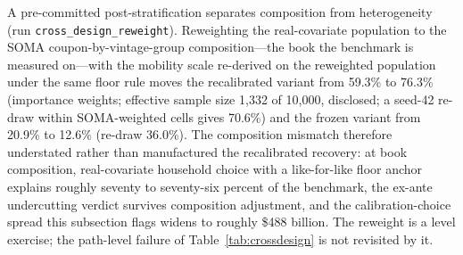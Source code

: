 \documentclass[12pt]{article}
\begin{document}
A pre-committed post-stratification separates composition from heterogeneity (run \texttt{cross\_design\_reweight}). Reweighting the real-covariate population to the SOMA coupon-by-vintage-group composition---the book the benchmark is measured on---with the mobility scale re-derived on the reweighted population under the same floor rule moves the recalibrated variant from 59.3\% to 76.3\% (importance weights; effective sample size 1{,}332 of 10{,}000, disclosed; a seed-42 re-draw within SOMA-weighted cells gives 70.6\%) and the frozen variant from 20.9\% to 12.6\% (re-draw 36.0\%). The composition mismatch therefore understated rather than manufactured the recalibrated recovery: at book composition, real-covariate household choice with a like-for-like floor anchor explains roughly seventy to seventy-six percent of the benchmark, the ex-ante undercutting verdict survives composition adjustment, and the calibration-choice spread this subsection flags widens to roughly \$488 billion. The reweight is a level exercise; the path-level failure of Table~\ref{tab:crossdesign} is not revisited by it.
\end{document}
